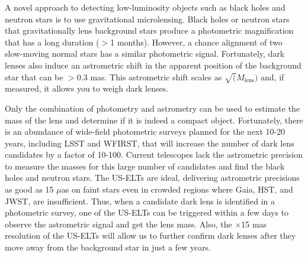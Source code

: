 \documentclass[11pt]{article}
\begin{document}
A novel approach to detecting low-luminosity objects such as black holes and neutron stars is to use gravitational microlensing. Black holes or neutron stars that gravitationally lens background stars produce a photometric magnification that has a long duration ($>$1 months). However, a chance alignment of two slow-moving normal stars has a similar photometric signal. Fortunately, dark lenses also induce an astrometric shift in the apparent position of the background star that can be $>$0.3 mas. This astrometric shift scales as $\sqrt(M_{\textrm{lens}})$ and, if measured, it allows you to weigh dark lenses.

Only the combination of photometry and astrometry can be used to estimate the mass of the lens and determine if it is indeed a compact object. Fortunately, there is an abundance of wide-field photometric surveys planned for the next 10-20 years, including LSST and WFIRST, that will increase the number of dark lens candidates by a factor of 10-100. Current telescopes lack the astrometric precision to measure the masses for this large number of candidates and find the black holes and neutron stars. The US-ELTs are ideal, delivering astrometric precisions as good as 15 $\mu$as on faint stars even in crowded regions where Gaia, HST, and JWST, are insufficient. Thus, when a candidate dark lens is identified in a photometric survey, one of the US-ELTs can be triggered within a few days to observe the astrometric signal and get the lens mass. Also, the $\times$15 mas resolution of the US-ELTs will allow us to further confirm dark lenses after they move away from the background star in just a few years.
\end{document}
